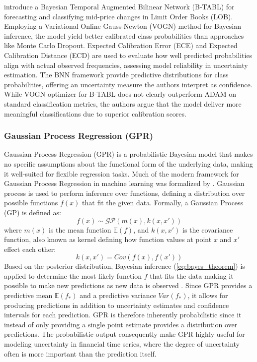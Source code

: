 \textcite{magris2023bayesian} introduce a Bayesian Temporal Augmented Bilinear Network (B-TABL) for forecasting and classifying mid-price changes in Limit Order Books (LOB). Employing a Variational Online Gauss-Newton (VOGN) method for Bayesian inference, the model yield better calibrated class probabilities than approaches like Monte Carlo Dropout. Expected Calibration Error (ECE) and Expected Calibration Distance (ECD) are used to evaluate how well predicted probabilities align with actual observed frequencies, assessing model reliability in uncertainty estimation. The BNN framework provide predictive distributions for class probabilities, offering an uncertainty measure the authors interpret as confidence. While VOGN optimizer for B-TABL does not clearly outperform ADAM on standard classification metrics, the authors argue that the model deliver more meaningful classifications due to superior calibration scores. 



\subsubsection{Gaussian Process Regression (GPR)}
Gaussian Process Regression (GPR) is a probabilistic Bayesian model that makes no specific assumptions about the functional form of the underlying data, making it well-suited for flexible regression tasks. Much of the modern framework for Gaussian Process Regression in machine learning was formalized by \textcite{rasmussen_williams_2006}. Gaussian process is used to perform inference over functions, defining a distribution over possible functions $f(x)$ that fit the given data. Formally, a Gaussian Process (GP)  is defined as: 
\begin{equation}
f(x) \sim \mathcal{GP}(m(x), k(x, x'))
\end{equation}
where $m(x)$ is the mean function $\mathbb{E}(f)$, and $k(x, x')$ is the covariance function, also known as kernel defining how function values at point $x$ and $ x'$ effect each other:
\begin{equation}
k(x, x')=Cov(f(x),f(x'))
\end{equation}
Based on the posterior distribution, Bayesian inference (\ref{eq:bayes_theorem}) is applied to determine the most likely function $f$ that fits the data making it possible to make new predictions as new data is observed \parencite{rasmussen_williams_2006}. Since GPR provides  a predictive mean $\mathbb{E}(f_*)$ and a predictive variance $Var(f_*)$, it allows for producing predictions in addition to uncertainty estimates and confidence intervals for each prediction. GPR is therefore inherently probabilistic since it instead of only providing a single point estimate provides a distribution over predictions.  The probabilistic output consequently make GPR highly useful for modeling uncertainty in financial time series, where the degree of uncertainty often is more important than the prediction itself. 

